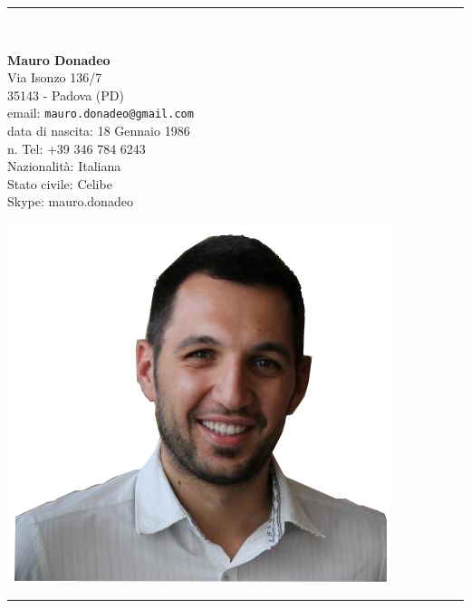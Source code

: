 \documentclass[pdftex,a4paper,10pt,twoside,titlepage,italian]{article}
\begin{document}
\begin{center}
\rule{.8 \textwidth}{1pt}\\[5pt]
\begin{minipage}{.55\textwidth}
	\LARGE\textbf{Mauro Donadeo}\\[16pt]
	\footnotesize Via Isonzo 136/7 \\ 
	35143 - Padova (PD)\\
	email: \texttt{mauro.donadeo@gmail.com}\\
	\footnotesize{data di nascita: 18 Gennaio 1986}\\
	\footnotesize {n. Tel: +39 346 784 6243}\\
	\footnotesize {Nazionalità: Italiana}\\
	\footnotesize {Stato civile: Celibe}\\
	\footnotesize {Skype: mauro.donadeo}
\end{minipage}
\begin{minipage}{.25\textwidth}
	\includegraphics[width=\textwidth]{io.jpg}
\end{minipage}
\rule{.8 \textwidth}{1pt}\\[5pt]
\end{center}
\end{document}

